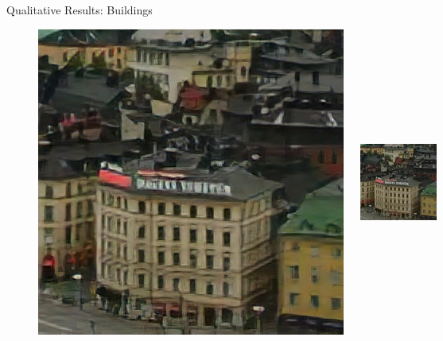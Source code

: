 \documentclass{beamer}
\begin{document}
\begin{frame}{Qualitative Results: Buildings}
\begin{figure}
  \begin{columns}
      \includegraphics[width=0.6\linewidth]{static/buildings_srunet.png}
      \includegraphics[width=0.15\linewidth]{static/buildings_compressed.png}
  \end{columns}

  \vspace{0.5cm} %


\end{figure}
\end{frame}
\end{document}
